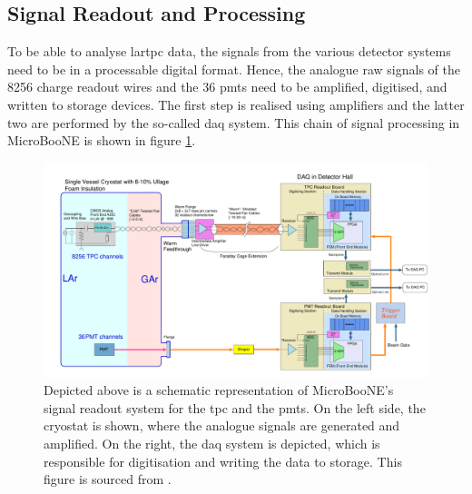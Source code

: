 \subsection{Signal Readout and Processing} \label{sec:MicroBooNEReadout}
To be able to analyse \gls{lartpc} data, the signals from the various detector systems need to be in a processable digital format. Hence, the analogue raw signals of the \num{8256} charge readout wires and the \num{36} \glspl{pmt} need to be amplified, digitised, and written to storage devices. The first step is realised using amplifiers and the latter two are performed by the so-called \gls{daq} system. This chain of signal processing in MicroBooNE is shown in figure \ref{fig:ReadoutSystem}.
\begin{figure}[htbp]
    \centering
    \includegraphics[width=1.0\textwidth]{images/MicroBooNE/DAQScheme.pdf}
    \caption[Schematics of the MicroBooNE Signal Readout System]{Depicted above is a schematic representation of MicroBooNE's signal readout system for the \gls{tpc} and the \glspl{pmt}. On the left side, the cryostat is shown, where the analogue signals are generated and amplified. On the right, the \gls{daq} system is depicted, which is responsible for digitisation and writing the data to storage. This figure is sourced from \cite{MicroBooNEDetector}.}
    \label{fig:ReadoutSystem}
\end{figure}

